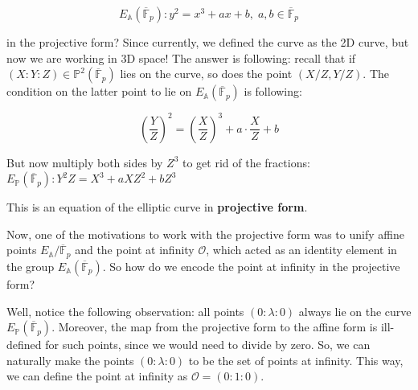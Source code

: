 \documentclass[../lecture-notes.tex]{subfiles}
\begin{document}
\vspace{-3mm}

\begin{equation*}
    E_{\mathbb{A}}(\overline{\mathbb{F}}_p): y^2 = x^3 + ax + b, \; a,b \in \overline{\mathbb{F}}_p
\end{equation*}

\vspace{-1mm}

in the projective form? Since currently, we defined the curve as the 2D curve, but now we are working in 3D space! The answer is following: recall that if $(X:Y:Z) \in \mathbb{P}^2(\overline{\mathbb{F}}_p)$ lies on the curve, so does the point $(X/Z,Y/Z)$. The condition on the latter point to lie on $E_{\mathbb{A}}(\overline{\mathbb{F}}_p)$ is following:

\vspace{-2mm}

\begin{equation*}
    \left(\frac{Y}{Z}\right)^2 = \left(\frac{X}{Z}\right)^3 + a\cdot \frac{X}{Z} + b
\end{equation*}

\vspace{-1mm}

But now multiply both sides by $Z^3$ to get rid of the fractions:
    $E_{\mathbb{P}}(\overline{\mathbb{F}}_p): Y^2Z = X^3 + aXZ^2 + bZ^3$


This is an equation of the elliptic curve in \textbf{projective form}. 

Now, one of the motivations to work with the projective form was to unify affine points $E_{\mathbb{A}}/\overline{\mathbb{F}}_p$ and the point at infinity $\mathcal{O}$, which acted as an identity element in the group $E_{\mathbb{A}}(\overline{\mathbb{F}}_p)$. So how do we encode the point at infinity in the projective form?

Well, notice the following observation: all points $(0:\lambda:0)$ always lie on the curve $E_{\mathbb{P}}(\overline{\mathbb{F}}_p)$. Moreover, the map from the projective form to the affine form is ill-defined for such points, since we would need to divide by zero. So, we can naturally make the points $(0:\lambda:0)$ to be the set of points at infinity. This way, we can define the point at infinity as $\mathcal{O} = (0:1:0)$.
\end{document}
